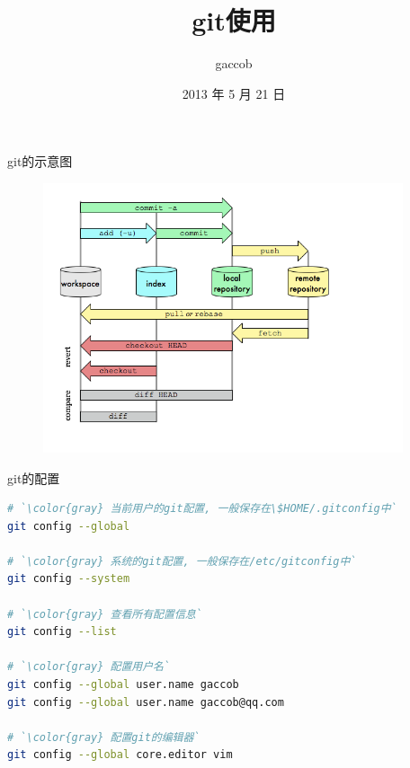 
\title {\ZHH \huge git使用}
\author {\small gaccob}
\date {\small 2013 年 5 月 21 日}
\maketitle

{\ZHH git的示意图}\par
\begin{figure}[htbp]
    \centering
    \includegraphics[width=300pt, keepaspectratio]{git.png}
\end{figure}
\vspace{10pt}


{\ZHH git的配置}\par
\begin{lstlisting}[language=bash]
# `\color{gray} 当前用户的git配置, 一般保存在\$HOME/.gitconfig中`
git config --global

# `\color{gray} 系统的git配置, 一般保存在/etc/gitconfig中`
git config --system

# `\color{gray} 查看所有配置信息`
git config --list

# `\color{gray} 配置用户名`
git config --global user.name gaccob
git config --global user.name gaccob@qq.com

# `\color{gray} 配置git的编辑器`
git config --global core.editor vim
\end{lstlisting} \par
\vspace{10pt}


